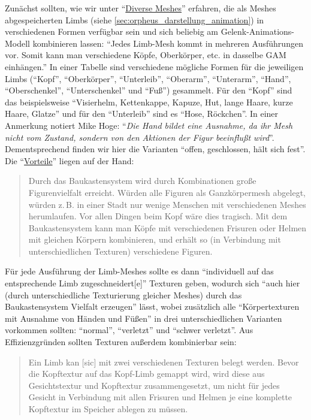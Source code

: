 \documentclass[a5paper,pagesize,numbers=noenddot]{scrbook}
\begin{document}
Zunächst sollten, wie wir unter \enquote{\uline{Diverse Meshes}} erfahren, die als Meshes abgespeicherten Limbs (siehe \autoref{sec:orpheus_darstellung_animation}) in verschiedenen Formen verfügbar sein und sich beliebig am Gelenk-Animations-Modell kombinieren lassen:
\enquote{Jedes Limb-Mesh kommt in mehreren Ausführungen vor.
Somit kann man verschiedene Köpfe, Oberkörper, etc. in dasselbe GAM einhängen.}
In einer Tabelle sind verschiedene mögliche Formen für die jeweiligen Limbs (\enquote{Kopf}, \enquote{Oberkörper}, \enquote{Unterleib}, \enquote{Oberarm}, \enquote{Unterarm}, \enquote{Hand}, \enquote{Oberschenkel}, \enquote{Unterschenkel} und \enquote{Fuß}) gesammelt.
Für den \enquote{Kopf} sind das beispielsweise \enquote{Visierhelm, Kettenkappe, Kapuze, Hut, lange Haare, kurze Haare, Glatze} und für den \enquote{Unterleib} sind es \enquote{Hose, Röckchen}.
In einer Anmerkung notiert Mike Hoge: \enquote{\textit{Die Hand bildet eine Ausnahme, da ihr Mesh nicht vom Zustand, sondern von den Aktionen der Figur beeinflußt wird}}.
Dementsprechend finden wir hier die Varianten \enquote{offen, geschlossen, hält sich fest}.
Die \enquote{\uline{Vorteile}} liegen auf der Hand:

\begin{quote}
   Durch das Baukastensystem wird durch Kombinationen große Figurenvielfalt erreicht.
   Würden alle Figuren als Ganzkörpermesh abgelegt, würden z.\,B. in einer Stadt nur wenige Menschen mit verschiedenen Meshes herumlaufen.
   Vor allen Dingen beim Kopf wäre dies tragisch.
   Mit dem Baukastensystem kann man Köpfe mit verschiedenen Frisuren oder Helmen mit gleichen Körpern kombinieren, und erhält so (in Verbindung mit unterschiedlichen Texturen) verschiedene Figuren.
\end{quote}

Für jede Ausführung der Limb-Meshes sollte es dann \enquote{individuell auf das entsprechende Limb zugeschneidert[e]} Texturen geben, wodurch sich \enquote{auch hier (durch unterschiedliche Texturierung gleicher Meshes) durch das Baukastensystem Vielfalt erzeugen} lässt, wobei zusätzlich alle \enquote{Körpertexturen mit Ausnahme von Händen und Füßen} in drei unterschiedlichen Varianten vorkommen sollten: \enquote{normal}, \enquote{verletzt} und \enquote{schwer verletzt}.
Aus Effizienzgründen sollten Texturen außerdem kombinierbar sein:

\begin{quote}
   Ein Limb kan [sic] mit zwei verschiedenen Texturen belegt werden.
   Bevor die Kopftextur auf das Kopf-Limb gemappt wird, wird diese aus Gesichtstextur und Kopftextur zusammengesetzt, um nicht für jedes Gesicht in Verbindung mit allen Frisuren und Helmen je eine komplette Kopftextur im Speicher ablegen zu müssen.
\end{quote}
\end{document}
